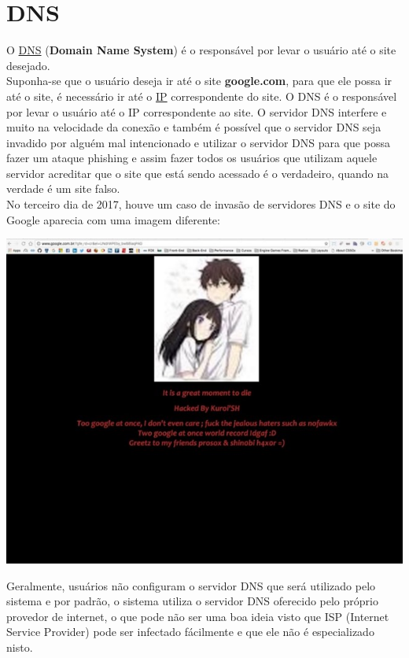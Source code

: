 \documentclass[12pt, letterpaper]{report}
\begin{document}
\pagebreak

\section*{DNS}
	O \href{https://criptowiki.miraheze.org/wiki/DNS_(Domain_Name_System)}{DNS} (\textbf{Domain Name System}) é o responsável por levar o usuário até o site desejado.\\
	Suponha-se que o usuário deseja ir até o site \textbf{google.com}, para que ele possa ir até o site, é necessário ir até o \href{https://pt.wikipedia.org/wiki/IP}{IP} correspondente do site. O DNS é o responsável por levar o usuário até o IP correspondente ao site.
	O servidor DNS interfere e muito na velocidade da conexão e também é possível que o servidor DNS seja invadido por alguém mal intencionado e utilizar o servidor DNS para que possa fazer um ataque phishing e assim fazer todos os usuários que utilizam aquele servidor acreditar que o site que está sendo acessado é o verdadeiro, quando na verdade é um site falso.\\

	No terceiro dia de 2017, houve um caso de invasão de servidores DNS e o site do Google aparecia com uma imagem diferente:

\begin{center} %
	\includegraphics[scale=0.7]{dns.jpg}\\
\end{center}

	Geralmente, usuários não configuram o servidor DNS que será utilizado pelo sistema e por padrão, o sistema utiliza o servidor DNS oferecido pelo próprio provedor de internet, o que pode não ser uma boa ideia visto que ISP (Internet Service Provider) pode ser infectado fácilmente e que ele não é especializado nisto.\\
\end{document}

